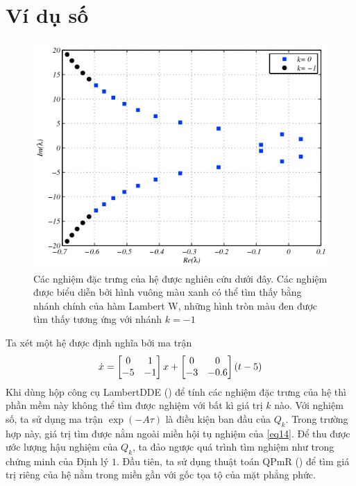 \section{Ví dụ số}
\begin{figure}[h!]
	\centering
	\includegraphics[scale= 0.7]{"./Hinh/Hinh 2"}
	\caption[Các nghiệm đặc trưng của hệ được nghiên cứu dưới đây. Các nghiệm được biểu diễn bởi hình vuông màu xanh có thể tìm thấy bằng nhánh chính của hàm Lambert W, những hình tròn màu đen được tìm thấy tương ứng với nhánh $k = -1$ ] {Các nghiệm đặc trưng của hệ được nghiên cứu dưới đây. Các nghiệm được biểu diễn bởi hình vuông màu xanh có thể tìm thấy bằng nhánh chính của hàm Lambert W, những hình tròn màu đen được tìm thấy tương ứng với nhánh $k = -1$}
	\label{fig:hinh-2}
\end{figure}
%
\noindent Ta xét một hệ được định nghĩa bởi ma trận
\begin{equation}\label{eq33}
	\dot{x} = \begin{bmatrix} 0 & 1\\ -5 &-1 \end{bmatrix}x + \begin{bmatrix} 	0 & 0\\ -3 &-0.6 \end{bmatrix}(t - 5)
\end{equation}
Khi dùng hộp công cụ LambertDDE (\cite{YiJune12}) để tính các nghiệm đặc trưng của hệ thì phần mềm này không thể tìm được nghiệm với bất kì giá trị $k$ nào. Với nghiệm số, ta sử dụng ma trận $\exp (-A\tau)$ là điều kiện ban đầu của $Q_k$. Trong trường hợp này, giá trị tìm được nằm ngoài miền hội tụ nghiệm của \eqref{eq14}.
Để thu được ước lượng hậu nghiệm của $Q_k$, ta đảo ngược quá trình tìm nghiệm như trong chứng minh của Định lý $1$. 
Đầu tiên, ta sử dụng thuật toán QPmR (\cite{Vyh09}) để tìm giá trị riêng của hệ nằm trong miền gần với gốc tọa tộ của mặt phẳng phức. 
